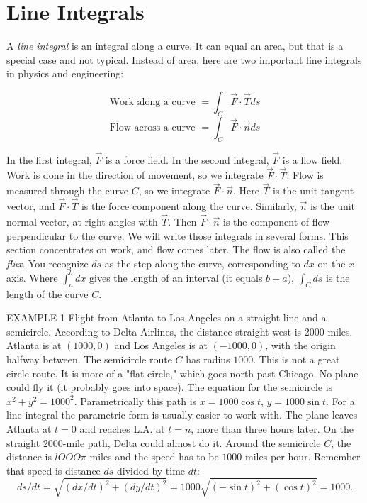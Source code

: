 \section{Line Integrals}\label{sec:line_integrals}
A \emph{line integral} is an integral along a curve. It can equal an area, but
that is a special case and not typical. Instead of area, here are two important line integrals in physics
and engineering:

{
$$\text{Work along a curve } = \int_C \vec F \cdot \vec T ds$$
 $$\text{Flow across a curve } = \int_C \vec F \cdot \vec n ds$$
}

In the first integral, $\vec F$ is a force field. In the second integral, $\vec F$ is a flow field. Work is done in the direction of movement, so we integrate $\vec F \cdot \vec T$. Flow is measured through the curve $C$, so we integrate $\vec F \cdot \vec n$. Here $\vec T$ is the unit tangent vector, and $\vec F \cdot \vec T$ is the
force component along the curve. Similarly, $\vec n$ is the unit normal vector, at right angles
with $\vec T$. Then $\vec F \cdot \vec n$ is the component of flow perpendicular to the curve.
We will write those integrals in several forms. This section concentrates on work, and
flow comes later. The flow is also called the \emph{flux}. You recognize $ds$
as the step along the curve, corresponding to $dx$ on the $x$ axis. Where $\int_a^b dx$ gives the length of an interval (it equals $b - a$), $\int_C ds$ is the length of the curve $C$.

EXAMPLE 1 Flight from Atlanta to Los Angeles on a straight line and a semicircle.
According to Delta Airlines, the distance straight west is 2000 miles. Atlanta is at
$(1000,0)$ and Los Angeles is at $(-1000, 0)$, with the origin halfway between. The
semicircle route $C$ has radius $1000$. This is not a great circle route. It is more of a
"flat circle," which goes north past Chicago. No plane could fly it (it probably goes
into space).
The equation for the semicircle is $x^2 + y^2 = 1000^2$. Parametrically this path is $x =
1000 \cos t$, $y = 1000 \sin t$. For a line integral the parametric form is usually easier to work with. The plane leaves
Atlanta at $t = 0$ and reaches L.A. at $t = n$, more than three hours later. On the straight
$2000$-mile path, Delta could almost do it. Around the semicircle $C$, the distance is
$lOOO\pi$ miles and the speed has to be $1000$ miles per hour. Remember that speed is
distance $ds$ divided by time $dt$:
$$ds/dt = \sqrt{(dx/dt)^2 + (dy/dt)^2} = 1000\sqrt{(- \sin t)^2 + (\cos t)^2} = 1000.$$

